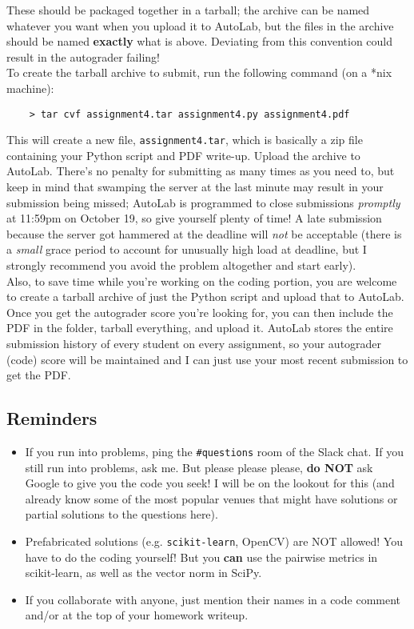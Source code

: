 \documentclass[paper=a4, fontsize=11pt]{scrartcl} %
\numberwithin{figure}{section} %
\numberwithin{table}{section} %
\begin{document}
These should be packaged together in a tarball; the archive can be named whatever you want when you upload it to AutoLab, but the files in the archive should be named \textbf{exactly} what is above. Deviating from this convention could result in the autograder failing! \\

To create the tarball archive to submit, run the following command (on a *nix machine):

\begin{verbatim}
	> tar cvf assignment4.tar assignment4.py assignment4.pdf
\end{verbatim}

This will create a new file, \texttt{assignment4.tar}, which is basically a zip file containing your Python script and PDF write-up. Upload the archive to AutoLab. There's no penalty for submitting as many times as you need to, but keep in mind that swamping the server at the last minute may result in your submission being missed; AutoLab is programmed to close submissions \emph{promptly} at 11:59pm on October 19, so give yourself plenty of time! A late submission because the server got hammered at the deadline will \emph{not} be acceptable (there is a \emph{small} grace period to account for unusually high load at deadline, but I strongly recommend you avoid the problem altogether and start early). \\

Also, to save time while you're working on the coding portion, you are welcome to create a tarball archive of just the Python script and upload that to AutoLab. Once you get the autograder score you're looking for, you can then include the PDF in the folder, tarball everything, and upload it. AutoLab stores the entire submission history of every student on every assignment, so your autograder (code) score will be maintained and I can just use your most recent submission to get the PDF.

\subsection{Reminders}

\begin{itemize}
	\item If you run into problems, ping the \texttt{\#questions} room of the Slack chat. If you still run into problems, ask me. But please please please, \textbf{do NOT} ask Google to give you the code you seek! I will be on the lookout for this (and already know some of the most popular venues that might have solutions or partial solutions to the questions here).
	\item Prefabricated solutions (e.g. \texttt{scikit-learn}, OpenCV) are NOT allowed! You have to do the coding yourself! But you \textbf{can} use the pairwise metrics in scikit-learn, as well as the vector norm in SciPy.
	\item If you collaborate with anyone, just mention their names in a code comment and/or at the top of your homework writeup.
\end{itemize}
\end{document}
